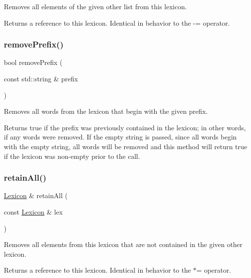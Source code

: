 Removes all elements of the given other list from this lexicon. 

Returns a reference to this lexicon. Identical in behavior to the -\/= operator. \mbox{\label{classLexicon_a998af18a2f0af7d18ce689acee75ca59}} 
\subsubsection{\texorpdfstring{remove\+Prefix()}{removePrefix()}}
{\footnotesize\ttfamily bool remove\+Prefix (\begin{DoxyParamCaption}\item[{const std\+::string \&}]{prefix }\end{DoxyParamCaption})}



Removes all words from the lexicon that begin with the given prefix. 

Returns true if the prefix was previously contained in the lexicon; in other words, if any words were removed. If the empty string is passed, since all words begin with the empty string, all words will be removed and this method will return true if the lexicon was non-\/empty prior to the call. \mbox{\label{classLexicon_a38501eec95ff302cb83dae17ab478b81}} 
\subsubsection{\texorpdfstring{retain\+All()}{retainAll()}\hspace{0.1cm}{\footnotesize\ttfamily [1/2]}}
{\footnotesize\ttfamily \mbox{\hyperlink{classLexicon}{Lexicon}} \& retain\+All (\begin{DoxyParamCaption}\item[{const \mbox{\hyperlink{classLexicon}{Lexicon}} \&}]{lex }\end{DoxyParamCaption})}



Removes all elements from this lexicon that are not contained in the given other lexicon. 

Returns a reference to this lexicon. Identical in behavior to the $\ast$= operator. \mbox{\label{classLexicon_a17b175aadba16c14093da01963914b33}} 
